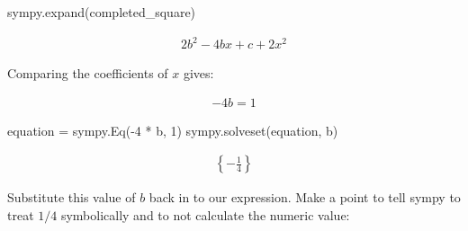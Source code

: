\begin{pyin}
sympy.expand(completed_square)
\end{pyin}

\begin{equation*}
\begin{split}\displaystyle 2 b^{2} - 4 b x + c + 2 x^{2}\end{split}
\end{equation*}

Comparing the coefficients of \(x\) gives:

\begin{equation*}
\begin{split}
  - 4 b = 1
\end{split}
\end{equation*}

\begin{pyin}
equation = sympy.Eq(-4 * b, 1)
sympy.solveset(equation, b)
\end{pyin}

\begin{equation*}
\begin{split}\displaystyle \left\{- \frac{1}{4}\right\}\end{split}
\end{equation*}

Substitute this value of \(b\) back in to our expression.
Make a point to tell sympy to treat \(1 / 4\) symbolically and to not
calculate the numeric value:

